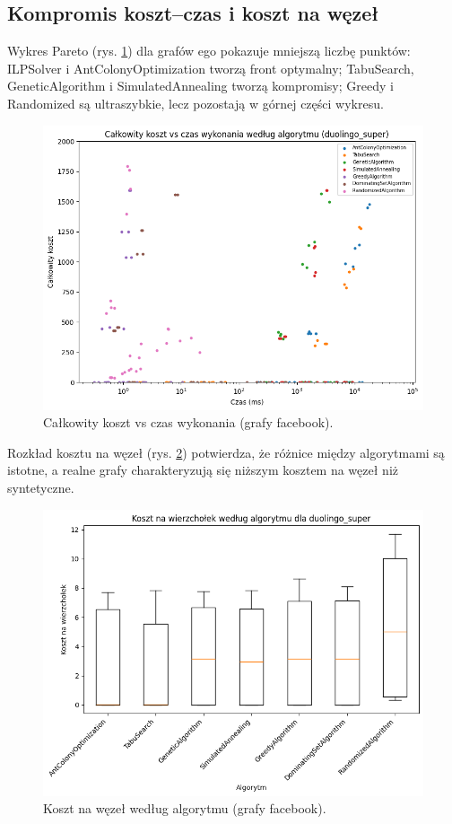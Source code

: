 \subsection{Kompromis koszt--czas i koszt na węzeł}

Wykres Pareto (rys. \ref{fig:facebook_pareto}) dla grafów ego pokazuje mniejszą liczbę punktów: ILPSolver i AntColonyOptimization tworzą front optymalny; TabuSearch, GeneticAlgorithm i SimulatedAnnealing tworzą kompromisy; Greedy i Randomized są ultraszybkie, lecz pozostają w górnej części wykresu.

\begin{figure}[H]
  \centering
  \includegraphics[width=0.7\linewidth]{assets/figures/facebook_pareto.png}
  \caption{Całkowity koszt vs czas wykonania (grafy facebook).}
  \label{fig:facebook_pareto}
\end{figure}

Rozkład kosztu na węzeł (rys. \ref{fig:facebook_cost_per_node}) potwierdza, że różnice między algorytmami są istotne, a realne grafy charakteryzują się niższym kosztem na węzeł niż syntetyczne.

\begin{figure}[H]
  \centering
  \includegraphics[width=0.7\linewidth]{assets/figures/facebook_cost_per_node.png}
  \caption{Koszt na węzeł według algorytmu (grafy facebook).}
  \label{fig:facebook_cost_per_node}
\end{figure}

